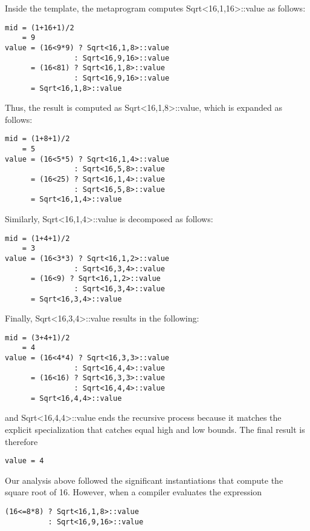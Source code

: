 Inside the template, the metaprogram computes Sqrt<16,1,16>::value as follows:

\begin{lstlisting}[style=styleCXX]
mid = (1+16+1)/2
	= 9
value = (16<9*9) ? Sqrt<16,1,8>::value
				: Sqrt<16,9,16>::value
	  = (16<81) ? Sqrt<16,1,8>::value
				: Sqrt<16,9,16>::value
	  = Sqrt<16,1,8>::value
\end{lstlisting}

Thus, the result is computed as Sqrt<16,1,8>::value, which is expanded as follows:

\begin{lstlisting}[style=styleCXX]
mid = (1+8+1)/2
	= 5
value = (16<5*5) ? Sqrt<16,1,4>::value
				: Sqrt<16,5,8>::value
	  = (16<25) ? Sqrt<16,1,4>::value
				: Sqrt<16,5,8>::value
	  = Sqrt<16,1,4>::value
\end{lstlisting}

Similarly, Sqrt<16,1,4>::value is decomposed as follows:

\begin{lstlisting}[style=styleCXX]
mid = (1+4+1)/2
	= 3
value = (16<3*3) ? Sqrt<16,1,2>::value
				: Sqrt<16,3,4>::value
	  = (16<9) ? Sqrt<16,1,2>::value
				: Sqrt<16,3,4>::value
	  = Sqrt<16,3,4>::value
\end{lstlisting}

Finally, Sqrt<16,3,4>::value results in the following:

\begin{lstlisting}[style=styleCXX]
mid = (3+4+1)/2
	= 4
value = (16<4*4) ? Sqrt<16,3,3>::value
				: Sqrt<16,4,4>::value
	  = (16<16) ? Sqrt<16,3,3>::value
				: Sqrt<16,4,4>::value
	  = Sqrt<16,4,4>::value
\end{lstlisting}

and Sqrt<16,4,4>::value ends the recursive process because it matches the explicit specialization that catches equal high and low bounds. The final result is therefore

\begin{lstlisting}[style=styleCXX]
value = 4
\end{lstlisting}


Our analysis above followed the significant instantiations that compute the square root of 16. However, when a compiler evaluates the expression

\begin{lstlisting}[style=styleCXX]
(16<=8*8) ? Sqrt<16,1,8>::value
		  : Sqrt<16,9,16>::value
\end{lstlisting}

